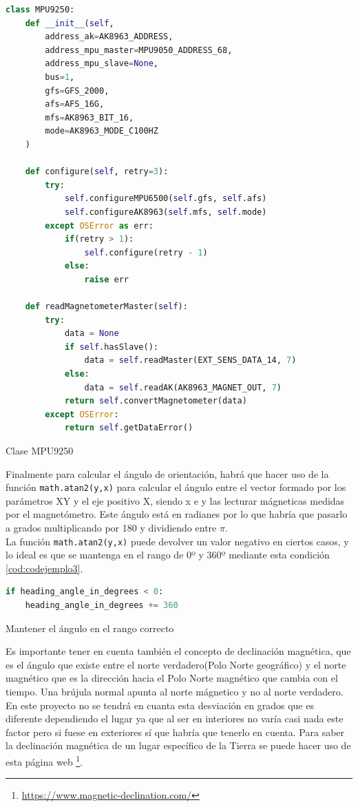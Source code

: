 \begin{code}[H]
\begin{lstlisting}[language=Python]
class MPU9250:
    def __init__(self, 
        address_ak=AK8963_ADDRESS, 
        address_mpu_master=MPU9050_ADDRESS_68, 
        address_mpu_slave=None, 
        bus=1, 
        gfs=GFS_2000, 
        afs=AFS_16G, 
        mfs=AK8963_BIT_16, 
        mode=AK8963_MODE_C100HZ
    )
       
    def configure(self, retry=3):
        try:
            self.configureMPU6500(self.gfs, self.afs)
            self.configureAK8963(self.mfs, self.mode)
        except OSError as err:
            if(retry > 1):
                self.configure(retry - 1)
            else:
                raise err
     
    def readMagnetometerMaster(self):
        try:
            data = None
            if self.hasSlave():
                data = self.readMaster(EXT_SENS_DATA_14, 7)          
            else:   
                data = self.readAK(AK8963_MAGNET_OUT, 7)
            return self.convertMagnetometer(data)
        except OSError:
            return self.getDataError()           
\end{lstlisting}
\caption[Clase MPU9250]{Clase MPU9250}
\label{cod:codejemplo}
\end{code}


Finalmente para calcular el ángulo de orientación, habrá que hacer uso de la función \verb|math.atan2(y,x)| para calcular el ángulo entre el vector formado por los parámetros XY y el eje positivo X, siendo x e y las lecturar mágneticas medidas por el magnetómetro. Este ángulo está en radianes por lo que habría que pasarlo a grados multiplicando por 180 y dividiendo entre \(\pi\).\\

La función \verb|math.atan2(y,x)| puede devolver un valor negativo en ciertos casos, y lo ideal es que se mantenga en el rango de 0º y 360º mediante esta condición \ref{cod:codejemplo3}.


\begin{code}[H]
\begin{lstlisting}[language=Python]
if heading_angle_in_degrees < 0:
    heading_angle_in_degrees += 360
\end{lstlisting}
\caption[Mantener el ángulo en el rango correcto]{Mantener el ángulo en el rango correcto}
\label{cod:codejemplo3}
\end{code}


Es importante tener en cuenta también el concepto de declinación magnética, que es el ángulo que existe entre el norte verdadero(Polo Norte geográfico) y el norte magnético que es la dirección hacia el Polo Norte magnético que cambia con el tiempo. Una brújula normal apunta al norte mágnetico y no al norte verdadero. En este proyecto no se tendrá en cuanta esta desviación en grados que es diferente dependiendo el lugar ya que al ser en interiores no varía casi nada este factor pero si fuese en exteriores sí que habría que tenerlo en cuenta. Para saber la declinación magnética de un lugar específico de la Tierra se puede hacer uso de esta página web \footnote{\url{https://www.magnetic-declination.com/}}.\\


